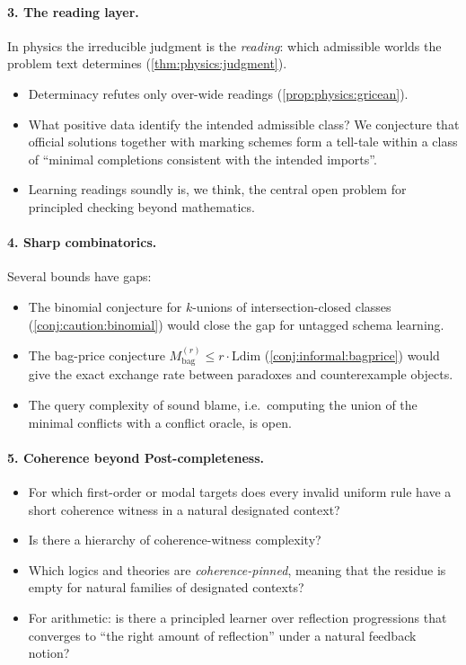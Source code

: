 \paragraph{3. The reading layer.} In physics the irreducible judgment is the \emph{reading}: which admissible worlds the problem text determines (\cref{thm:physics:judgment}).
\begin{itemize}
\item Determinacy refutes only over-wide readings (\cref{prop:physics:gricean}).
\item What positive data identify the intended admissible class? We conjecture that official solutions together with marking schemes form a tell-tale within a class of ``minimal completions consistent with the intended imports''.
\item Learning readings soundly is, we think, the central open problem for principled checking beyond mathematics.
\end{itemize}

\paragraph{4. Sharp combinatorics.} Several bounds have gaps:
\begin{itemize}
\item The binomial conjecture for $k$-unions of intersection-closed classes (\cref{conj:caution:binomial}) would close the gap for untagged schema learning.
\item The bag-price conjecture $M_{\mathrm{bag}}^{(r)}\le r\cdot\mathrm{Ldim}$ (\cref{conj:informal:bagprice}) would give the exact exchange rate between paradoxes and counterexample objects.
\item The query complexity of sound blame, i.e.\ computing the union of the minimal conflicts with a conflict oracle, is open.
\end{itemize}

\paragraph{5. Coherence beyond Post-completeness.}
\begin{itemize}
\item For which first-order or modal targets does every invalid uniform rule have a short coherence witness in a natural designated context?
\item Is there a hierarchy of coherence-witness complexity?
\item Which logics and theories are \emph{coherence-pinned}, meaning that the residue is empty for natural families of designated contexts?
\item For arithmetic: is there a principled learner over reflection progressions that converges to ``the right amount of reflection'' under a natural feedback notion?
\end{itemize}

